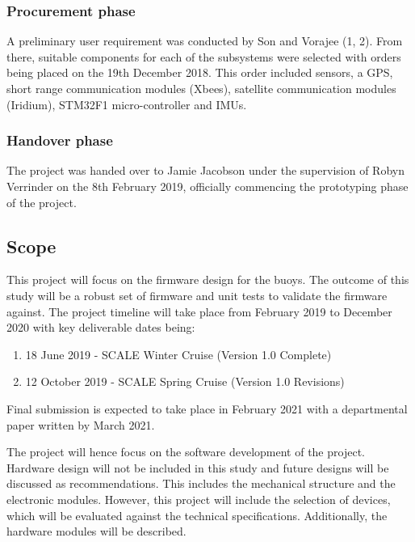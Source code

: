 \subsubsection{Procurement phase}

A preliminary user requirement was conducted by Son and Vorajee (1, 2). From there, suitable components for each of the subsystems were selected with orders being placed on the 19th December 2018. This order included sensors, a GPS, short range communication modules (Xbees), satellite communication modules (Iridium), STM32F1 micro-controller and IMUs.

\subsubsection{Handover phase}

The project was handed over to Jamie Jacobson under the supervision of Robyn Verrinder on the 8th February 2019, officially commencing the prototyping phase of the project.

\subsection{Scope}

This project will focus on the firmware design for the buoys. The outcome of this study will be a robust set of firmware and unit tests to validate the firmware against. The project timeline will take place from February 2019 to December 2020 with key deliverable dates being:

\begin{enumerate}
    \item 18 June 2019 - SCALE Winter Cruise  (Version 1.0 Complete)
    \item 12 October 2019 - SCALE Spring Cruise (Version 1.0 Revisions)
\end{enumerate}

Final submission is expected to take place in February 2021 with a departmental paper written by March 2021. \par 


The project will hence focus on the software development of the project. Hardware design will not be included in this study and future designs will be discussed as recommendations. This includes the mechanical structure and the electronic modules. However, this project will include the selection of devices, which will be evaluated against the technical specifications. Additionally, the hardware modules will be described.\par 

